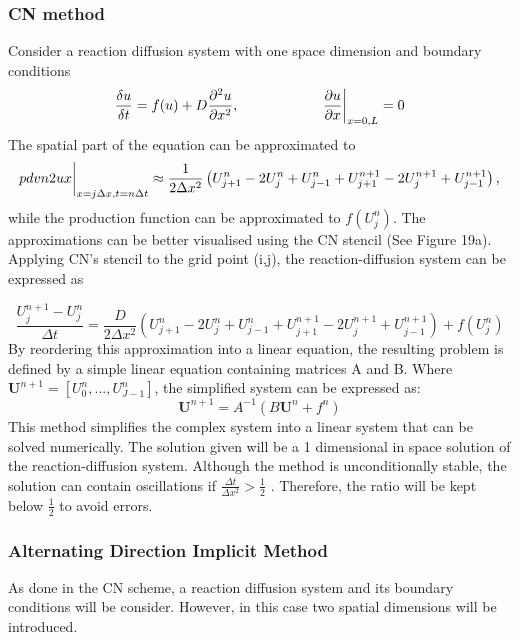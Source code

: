 \subsubsection{\acrlong{CN} method}\label{cranknicolson}
Consider a reaction diffusion system with one space dimension and boundary conditions
\begin{equation}
    \frac{\delta u}{\delta t} =  f(u) + D\frac{\partial^{2} {u}}{\partial {x}^{2}},   \quad \quad \quad \quad \quad \quad \pdv{u}{x}\biggr\rvert_{x=0,L}=0
\end{equation}
The spatial part of the equation can be approximated to
\begin{equation}
    \\pdvn{2}{u}{x} \biggr\rvert_{x=j\Delta x,t=n\Delta t} \approx \frac{1}{2\Delta x^{2}}\left( U^{n}_{j+1} -  2U^{n}_{j} + U^{n}_{j-1} + U^{n+1}_{j+1} - 2U^{n+1}_{j} + U^{n+1}_{j-1}\right),
\end{equation}
while the production function can be approximated to $f ( U^{n}_{j})$.  The approximations can be better visualised using the \acrshort{CN} stencil (See Figure 19a). Applying \acrshort{CN}'s stencil to the grid point (i,j), the reaction-diffusion system can be expressed as

\begin{equation}
    \frac{U^{n+1}_{j} - U^{n}_{j} }{\Delta t} = \frac{D}{2\Delta x^{2}}\left( U^{n}_{j+1} -  2U^{n}_{j} + U^{n}_{j-1} + U^{n+1}_{j+1} - 2U^{n+1}_{j} + U^{n+1}_{j-1}\right) +  f( U^{n}_{j})
\end{equation}
By reordering this approximation into a linear equation, the resulting problem is defined by a simple linear equation containing matrices A and B. Where $\textbf{U}^{n+1} = [U^{n}_{0}, ... , U^{n}_{J-1}]$, the simplified system can be expressed as:
\begin{equation}
    \textbf{U}^{n+1} = A^{-1}(B\textbf{U}^{n} + f^{n})
\end{equation}
This method simplifies the complex system into a linear system that can be solved numerically. The solution given will be a 1 dimensional in space solution of the reaction-diffusion system. Although the method is  unconditionally stable, the solution can contain oscillations if $ \frac{\Delta t}{\Delta x^{2}} >\frac{1}{2} $ \parencite{trefethen1996finite}. Therefore, the ratio will be kept below $\frac{1}{2}$ to avoid errors.

\subsubsection{Alternating Direction Implicit Method}\label{ADI}
As done in the \acrshort{CN} scheme, a reaction diffusion system and its boundary conditions will be consider. However, in this case two spatial dimensions will be introduced.

